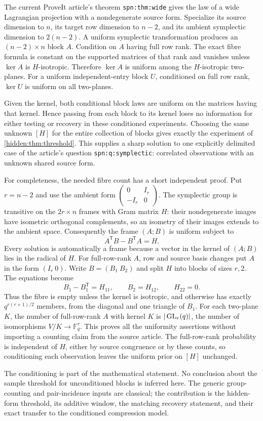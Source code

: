The current ProveIt article's theorem \texttt{spn:thm:wide} gives the law
of a wide Lagrangian projection with a nondegenerate source form.
Specialize its source dimension to $n$, its target row dimension to
$n-2$, and its ambient symplectic dimension to $2(n-2)$. A uniform
symplectic transformation produces an $(n-2)\times n$ block $A$.
Condition on $A$ having full row rank. The exact fibre formula is constant
on the supported matrices of that rank and vanishes unless
$\ker A$ is $H$-isotropic. Therefore $\ker A$ is uniform among the
$H$-isotropic two-planes. For a uniform independent-entry block $U$,
conditioned on full row rank, $\ker U$ is uniform on all two-planes.

Given the kernel, both conditional block laws are uniform on the matrices
having that kernel. Hence passing from each block to its kernel loses no
information for either testing or recovery in these conditioned
experiments. Choosing the same unknown $[H]$ for the entire collection
of blocks gives exactly the experiment of \cref{hidden:thm:threshold}.
This supplies a sharp solution to one explicitly delimited case of the
article's question \texttt{spn:q:symplectic}: correlated observations
with an unknown shared source form.

For completeness, the needed fibre count has a short independent proof.
Put $r=n-2$ and use the ambient form
$\left(\begin{smallmatrix}0&I_r\\-I_r&0\end{smallmatrix}\right)$.
The symplectic group is transitive on the $2r\times n$ frames with Gram
matrix $H$: their nondegenerate images have isometric orthogonal
complements, so an isometry of their images extends to the ambient space.
Consequently the frame $(A;B)$ is uniform subject to
\[
 A^{\mathsf T}B-B^{\mathsf T}A=H.
\]
Every solution is automatically a frame because a vector in the kernel of
$(A;B)$ lies in the radical of $H$. For full-row-rank $A$, row and source
basis changes put $A$ in the form $(I_r\ 0)$. Write $B=(B_1\ B_2)$ and
split $H$ into blocks of sizes $r,2$. The equations become
\[
 B_1-B_1^{\mathsf T}=H_{11},\qquad B_2=H_{12},\qquad H_{22}=0.
\]
Thus the fibre is empty unless the kernel is isotropic, and otherwise has
exactly $q^{r(r+1)/2}$ members, from the diagonal and one triangle of
$B_1$. For each two-plane $K$, the number of full-row-rank $A$ with kernel
$K$ is $|\operatorname{GL}_r(q)|$, the number of isomorphisms $V/K\to\mathbb F_q^r$.
This proves all the uniformity assertions without importing a counting
claim from the source article. The full-row-rank probability is
independent of $H$, either by source congruence or by these counts, so
conditioning each observation leaves the uniform prior on $[H]$ unchanged.

The conditioning is part of the mathematical statement. No conclusion
about the sample threshold for unconditioned blocks is inferred here.
The generic group-counting and pair-incidence inputs are classical; the
contribution is the hidden-form threshold, its additive window, the
matching recovery statement, and their exact transfer to the conditioned
compression model.
